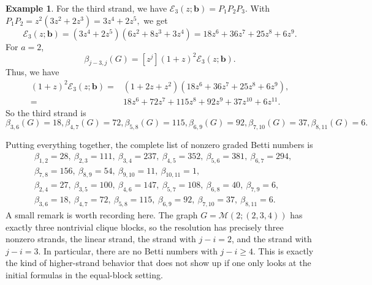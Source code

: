 \documentclass[12pt]{article}
\theoremstyle{definition}
\newtheorem{example}[theorem]{Example}
\theoremstyle{remark}
\newcommand{\EE}{\mathcal{E}}
\newcommand{\MM}{\mathcal{M}}
\newcommand{\bk}[1]{\mathbf{#1}}
\begin{document}
\begin{example}
		\medskip
		\noindent
		For the third strand,  we have
		$ \EE_3(z;\bk{b})=P_1P_2P_3. $
		With 
		$ P_1P_2=z^2(3z^2+2z^3)=3z^4+2z^5, $
		we get
		$$
		\EE_3(z;\bk{b})
		= (3z^4+2z^5)(6z^2+8z^3+3z^4)
		=
		18z^6+36z^7+25z^8+6z^9.
		$$
		For $a=2$,
		$$
		\beta_{j-3,j}(G)=[z^j](1+z)^2\EE_3(z;\bk{b}).
		$$
		Thus, we have
		\begin{align*}
		(1+z)^2\EE_3(z;\bk{b})
		=& (1+2z+z^2)(18z^6+36z^7+25z^8+6z^9),\\
		=&18z^6+72z^7+115z^8+92z^9+37z^{10}+6z^{11}.
		\end{align*}
		So the third strand is
		$$
		\beta_{3,6}(G)=18,
		\beta_{4,7}(G)=72,
		\beta_{5,8}(G)=115, 
		\beta_{6,9}(G)=92,
		\beta_{7,10}(G)=37,
		\beta_{8,11}(G)=6.
		$$
		
		\medskip
		\noindent
		Putting everything together, the complete list of nonzero graded Betti numbers is
		$$
		\begin{aligned}
			&\beta_{1,2}=28,\ \beta_{2,3}=111,\ \beta_{3,4}=237,\ \beta_{4,5}=352,\ \beta_{5,6}=381,\ \beta_{6,7}=294,\\
			&\beta_{7,8}=156,\ \beta_{8,9}=54,\ \beta_{9,10}=11,\ \beta_{10,11}=1,\\
			&\beta_{2,4}=27,\ \beta_{3,5}=100,\ \beta_{4,6}=147,\ \beta_{5,7}=108,\ \beta_{6,8}=40,\ \beta_{7,9}=6,\\
			&\beta_{3,6}=18,\ \beta_{4,7}=72,\ \beta_{5,8}=115,\ \beta_{6,9}=92,\ \beta_{7,10}=37,\ \beta_{8,11}=6.
		\end{aligned}
		$$
		 A small remark is worth recording here. The graph $G=\MM(2;(2,3,4))$ has exactly three nontrivial clique blocks, so the resolution has precisely three nonzero strands, the linear strand, the strand with $j-i=2$, and the strand with $j-i=3$. In particular, there are no Betti numbers with $j-i\geq 4$. This is exactly the kind of higher-strand behavior that does not show up if one only looks at the initial formulas in the equal-block setting.
	\end{example}
	
\end{document}
